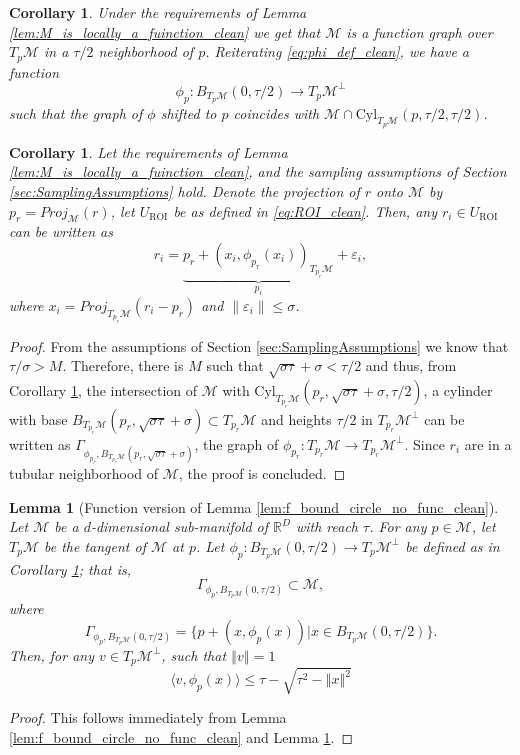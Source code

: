 \documentclass[12pt]{article}
\newtheorem{Lemma}[Theorem]{Lemma}
\newtheorem{corollary}[Theorem]{Corollary}
\theoremstyle{remark}
\newcommand{\RR}{\mathbb{R}}
\newcommand{\MM}{\mathcal{M}}
\newcommand{\eps}{\varepsilon}
\newcommand{\norm}[1]{\left\Vert #1 \right\Vert}
\newcommand{\lrangle}[1]{\langle #1 \rangle}
\begin{document}
\begin{appendices}
\begin{corollary} \label{cor:GraphOfFunctionTau2_clean}
Under the requirements of Lemma \ref{lem:M_is_locally_a_fuinction_clean} we get that $\MM$ is a function graph over $T_{p}\MM$ in a ${\tau}/2$ neighborhood of $p$. 
Reiterating \eqref{eq:phi_def_clean}, we have a function 
\[
\phi_p:B_{T_p\MM}(0,\tau/2) \rightarrow T_p\MM^\perp
\]
such that the graph of $\phi$ shifted to $p$ coincides with $\MM \cap \mathrm{Cyl}_{T_p\MM}(p,\tau/2,\tau/2)$.

\end{corollary}

\begin{corollary}\label{cor:GraphOfFunctionTau_ROI}
Let the requirements of Lemma \ref{lem:M_is_locally_a_fuinction_clean}, and the sampling assumptions of Section \ref{sec:SamplingAssumptions} hold. Denote the projection of $r$ onto $\MM$ by $p_r = Proj_\MM(r)$, let $U_{\textrm{ROI}}$ be as defined in \eqref{eq:ROI_clean}. 
Then, any $r_i \in U_{\textrm{ROI}}$ can be written as
\begin{equation}\label{eq:FunctionGraph_pi_ei_clean}
r_i = \underbrace{p_r + (x_i, \phi_{p_r}(x_i))_{T_{p_r}\MM}}_{p_i}+\eps_i
,\end{equation}
where $x_i= Proj_{T_{p_r}\MM}(r_i - p_r)$ and $\|\eps_i\| \leq \sigma$.
\end{corollary}
\begin{proof}
From the assumptions of Section \ref{sec:SamplingAssumptions} we know that  $\tau/\sigma > M $.
Therefore, there is $M$ such that $\sqrt{\sigma\tau}+\sigma < \tau/2$ and thus, from Corollary \ref{cor:GraphOfFunctionTau2_clean}, the intersection of $\MM$ with $\textrm{Cyl}_{T_{p_r}\MM}(p_r,\sqrt{\sigma \tau}+\sigma, \tau/2)$, a cylinder with base $B_{T_{p_r}\MM}(p_r, \sqrt{\sigma\tau}+\sigma)\subset T_{p_r}\MM$ and heights $\tau/2$ in $T_{p_r}\MM^\perp$ can be written as $\Gamma_{\phi_{p_r}, B_{T_{p_r}\MM}(p_r, \sqrt{\sigma\tau} + \sigma)}$, the graph of $\phi_{p_r}:T_{p_r}\MM\to T_{p_r}\MM^\perp$. Since $r_i$ are in a tubular neighborhood of $\MM$, the proof is concluded. 
\end{proof}


\begin{Lemma}[Function version of Lemma \ref{lem:f_bound_circle_no_func_clean}]\label{lem:f_bound_circle_clean}
    Let $\MM$ be a $d$-dimensional sub-manifold of $\RR^D$ with reach $\tau$. For any $p \in \MM$, let $T_{p}\MM$ be the tangent of $\MM$ at $p$.
    Let $\phi_p:B_{T_p\MM}(0, \tau/2)\to T_p\MM^\perp$ be defined as in Corollary \ref{cor:GraphOfFunctionTau2_clean}; that is, 
    \[\Gamma_{\phi_p,B_{T_p\MM}(0, \tau/2)}\subset\MM,\]
    where
    \[\Gamma_{\phi_p,B_{T_p\MM}(0, \tau/2)} = \{p + (x, \phi_p(x)) | x\in B_{T_p\MM}(0, \tau/2)\}.\]
    Then, for any $v \in T_p\MM^\perp$, such that $\norm{v} = 1$
    \[
    \lrangle{v, \phi_p(x)} \leq \tau-\sqrt{\tau^2-\norm{x}^2}
    \]
\end{Lemma}
\begin{proof}
    This follows immediately from Lemma \ref{lem:f_bound_circle_no_func_clean} and Lemma \ref{cor:GraphOfFunctionTau2_clean}.
\end{proof}


\end{appendices}
\end{document}
